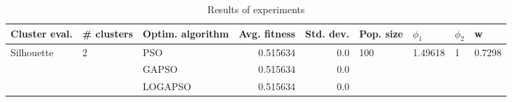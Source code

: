 \begin{table}
\centering
\caption{Results of experiments}
\begin{tabular}{lllrrllll}
\toprule
              Cluster eval. &        \# clusters & Optim. algorithm &  Avg. fitness &  Std. dev. &            Pop. size &               $\phi_{1}$ &         $\phi_{2}$ &                       w \\
\midrule
\multirow{3}{*}{Silhouette} & \multirow{3}{*}{2} &              PSO &      0.515634 &        0.0 & \multirow{3}{*}{100} & \multirow{3}{*}{1.49618} & \multirow{3}{*}{1} & \multirow{3}{*}{0.7298} \\
                            &                    &            GAPSO &      0.515634 &        0.0 &                      &                          &                    &                         \\
                            &                    &          LOGAPSO &      0.515634 &        0.0 &                      &                          &                    &                         \\
\bottomrule
\end{tabular}
\end{table}
